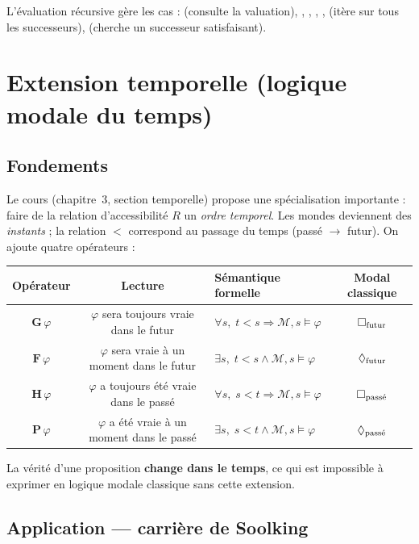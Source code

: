 \noindent L'évaluation récursive gère les cas :
 (consulte la valuation),
, , , ,
 (itère sur tous les successeurs),
 (cherche un successeur satisfaisant).

\section{Extension temporelle (logique modale du temps)}

\subsection{Fondements}

Le cours (chapitre~3, section temporelle) propose une spécialisation
importante : faire de la relation d'accessibilité $R$ un \emph{ordre
temporel}. Les mondes deviennent des \emph{instants} ; la relation $<$
correspond au passage du temps (passé $\to$ futur). On ajoute quatre
opérateurs :

\begin{center}
\begin{tabular}{cclc}
\toprule
\textbf{Opérateur} & \textbf{Lecture} & \textbf{Sémantique formelle} & \textbf{Modal classique} \\
\midrule
$\mathbf{G}\,\varphi$ & $\varphi$ sera toujours vraie dans le futur
   & $\forall s,\; t<s \Rightarrow \mathcal{M},s\models\varphi$
   & $\Box_{\text{futur}}$ \\
$\mathbf{F}\,\varphi$ & $\varphi$ sera vraie à un moment dans le futur
   & $\exists s,\; t<s \land \mathcal{M},s\models\varphi$
   & $\Diamond_{\text{futur}}$ \\
$\mathbf{H}\,\varphi$ & $\varphi$ a toujours été vraie dans le passé
   & $\forall s,\; s<t \Rightarrow \mathcal{M},s\models\varphi$
   & $\Box_{\text{passé}}$ \\
$\mathbf{P}\,\varphi$ & $\varphi$ a été vraie à un moment dans le passé
   & $\exists s,\; s<t \land \mathcal{M},s\models\varphi$
   & $\Diamond_{\text{passé}}$ \\
\bottomrule
\end{tabular}
\end{center}

\noindent La vérité d'une proposition \textbf{change dans le temps}, ce qui est
impossible à exprimer en logique modale classique sans cette extension.

\subsection{Application --- carrière de Soolking}

